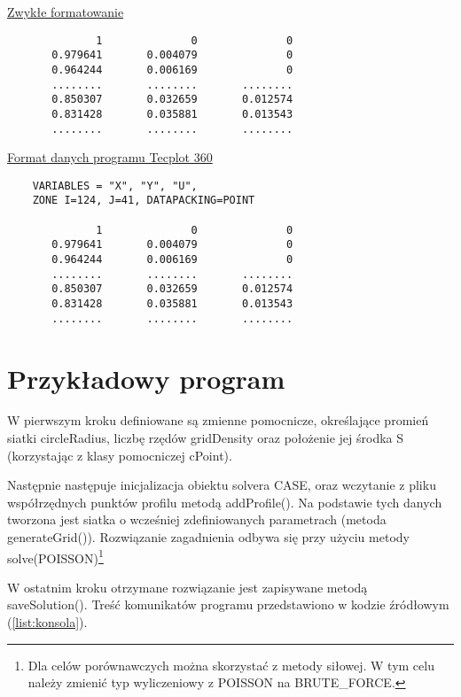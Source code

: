 \begin{lstlisting}[label=list:dane_wyjściowe,caption=Format zapisu danych wyjściowych]
\end{lstlisting}\begin{center}
\underline{Zwykłe formatowanie}
\end{center}
\begin{lstlisting}  
              1              0              0
       0.979641       0.004079              0
       0.964244       0.006169              0 
       ........       ........       ........
       0.850307       0.032659       0.012574
       0.831428       0.035881       0.013543
	   ........       ........	     ........	
\end{lstlisting}
\begin{center}
\underline{Format danych programu Tecplot 360}
\end{center}
\begin{lstlisting}  
	VARIABLES = "X", "Y", "U",
	ZONE I=124, J=41, DATAPACKING=POINT

              1              0              0
       0.979641       0.004079              0
       0.964244       0.006169              0 
       ........       ........       ........
       0.850307       0.032659       0.012574
       0.831428       0.035881       0.013543
	   ........       ........	     ........
\end{lstlisting}


\section{Przykładowy program}

\indent\indent W pierwszym kroku definiowane są zmienne pomocnicze, określające promień siatki \textsf{circleRadius}, liczbę rzędów \textsf{gridDensity} oraz położenie jej środka \textsf{S} (korzystając z  klasy pomocniczej \textsf{cPoint}).

Następnie następuje inicjalizacja obiektu solvera \textsf{CASE}, oraz wczytanie z pliku współrzędnych punktów profilu metodą \textsf{addProfile()}. Na podstawie tych danych tworzona jest siatka o wcześniej zdefiniowanych parametrach (metoda \textsf{generateGrid()}). Rozwiązanie zagadnienia odbywa się przy użyciu metody \textsf{solve(POISSON)}\footnote{Dla celów porównawczych można skorzystać z metody siłowej. W tym celu należy zmienić typ wyliczeniowy z \textsf{POISSON} na \textsf{BRUTE\_FORCE}.}

W ostatnim kroku otrzymane rozwiązanie jest zapisywane metodą \\ \mbox{\textsf{saveSolution()}}. Treść komunikatów programu przedstawiono w kodzie źródłowym (\ref{list:konsola}).

